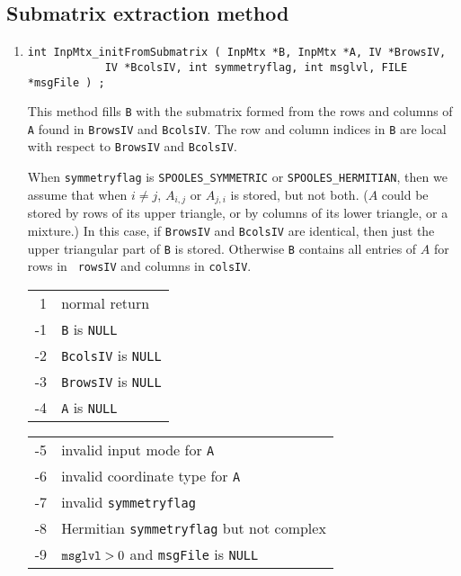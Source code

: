 \subsection{Submatrix extraction method}
\label{subsection:InpMtx:proto:extract}
\par
\begin{enumerate}
\item
\begin{verbatim}
int InpMtx_initFromSubmatrix ( InpMtx *B, InpMtx *A, IV *BrowsIV, 
            IV *BcolsIV, int symmetryflag, int msglvl, FILE *msgFile ) ;
\end{verbatim}
This method fills {\tt B} with the submatrix formed from the rows
and columns of {\tt A} found 
in {\tt BrowsIV} and {\tt BcolsIV}.
The row and column indices in {\tt B} are local with respect to
{\tt BrowsIV} and {\tt BcolsIV}.
\par
When {\tt symmetryflag} is {\tt SPOOLES\_SYMMETRIC} or 
{\tt SPOOLES\_HERMITIAN}, then we assume that when $i \ne j$,
$A_{i,j}$ or $A_{j,i}$ is stored, but not both.
($A$ could be stored by rows of its upper triangle, or by columns
of its lower triangle, or a mixture.)
In this case,
if {\tt BrowsIV} and {\tt BcolsIV} are identical, then just the upper
triangular part of {\tt B} is stored. 
Otherwise {\tt B} contains all entries of $A$ for rows in {\tt
rowsIV} and columns in {\tt colsIV}.
\par {}
\begin{center}
\begin{tabular}{rl}
 1 & normal return \\
-1 & {\tt B} is {\tt NULL} \\
-2 & {\tt BcolsIV} is {\tt NULL} \\
-3 & {\tt BrowsIV} is {\tt NULL} \\
-4 & {\tt A} is {\tt NULL} \\
\end{tabular}
\quad
\begin{tabular}{rl}
-5 & invalid input mode for {\tt A} \\
-6 & invalid coordinate type for {\tt A} \\
-7 & invalid {\tt symmetryflag} \\
-8 & Hermitian {\tt symmetryflag} but not complex \\
-9 & ${\tt msglvl} > 0$ and {\tt msgFile} is {\tt NULL}
\end{tabular}
\end{center}
\end{enumerate}
\par
